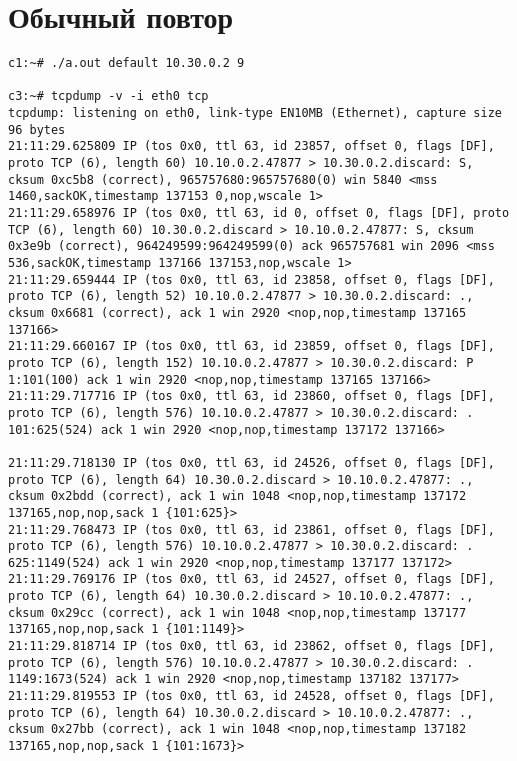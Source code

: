 \documentclass[a4paper,12pt]{article}
\begin{document}
\section{Обычный повтор}

\begin{lstlisting}
c1:~# ./a.out default 10.30.0.2 9

c3:~# tcpdump -v -i eth0 tcp
tcpdump: listening on eth0, link-type EN10MB (Ethernet), capture size 96 bytes
21:11:29.625809 IP (tos 0x0, ttl 63, id 23857, offset 0, flags [DF], proto TCP (6), length 60) 10.10.0.2.47877 > 10.30.0.2.discard: S, cksum 0xc5b8 (correct), 965757680:965757680(0) win 5840 <mss 1460,sackOK,timestamp 137153 0,nop,wscale 1>
21:11:29.658976 IP (tos 0x0, ttl 63, id 0, offset 0, flags [DF], proto TCP (6), length 60) 10.30.0.2.discard > 10.10.0.2.47877: S, cksum 0x3e9b (correct), 964249599:964249599(0) ack 965757681 win 2096 <mss 536,sackOK,timestamp 137166 137153,nop,wscale 1>
21:11:29.659444 IP (tos 0x0, ttl 63, id 23858, offset 0, flags [DF], proto TCP (6), length 52) 10.10.0.2.47877 > 10.30.0.2.discard: ., cksum 0x6681 (correct), ack 1 win 2920 <nop,nop,timestamp 137165 137166>
21:11:29.660167 IP (tos 0x0, ttl 63, id 23859, offset 0, flags [DF], proto TCP (6), length 152) 10.10.0.2.47877 > 10.30.0.2.discard: P 1:101(100) ack 1 win 2920 <nop,nop,timestamp 137165 137166>
21:11:29.717716 IP (tos 0x0, ttl 63, id 23860, offset 0, flags [DF], proto TCP (6), length 576) 10.10.0.2.47877 > 10.30.0.2.discard: . 101:625(524) ack 1 win 2920 <nop,nop,timestamp 137172 137166>

21:11:29.718130 IP (tos 0x0, ttl 63, id 24526, offset 0, flags [DF], proto TCP (6), length 64) 10.30.0.2.discard > 10.10.0.2.47877: ., cksum 0x2bdd (correct), ack 1 win 1048 <nop,nop,timestamp 137172 137165,nop,nop,sack 1 {101:625}>
21:11:29.768473 IP (tos 0x0, ttl 63, id 23861, offset 0, flags [DF], proto TCP (6), length 576) 10.10.0.2.47877 > 10.30.0.2.discard: . 625:1149(524) ack 1 win 2920 <nop,nop,timestamp 137177 137172>
21:11:29.769176 IP (tos 0x0, ttl 63, id 24527, offset 0, flags [DF], proto TCP (6), length 64) 10.30.0.2.discard > 10.10.0.2.47877: ., cksum 0x29cc (correct), ack 1 win 1048 <nop,nop,timestamp 137177 137165,nop,nop,sack 1 {101:1149}>
21:11:29.818714 IP (tos 0x0, ttl 63, id 23862, offset 0, flags [DF], proto TCP (6), length 576) 10.10.0.2.47877 > 10.30.0.2.discard: . 1149:1673(524) ack 1 win 2920 <nop,nop,timestamp 137182 137177>
21:11:29.819553 IP (tos 0x0, ttl 63, id 24528, offset 0, flags [DF], proto TCP (6), length 64) 10.30.0.2.discard > 10.10.0.2.47877: ., cksum 0x27bb (correct), ack 1 win 1048 <nop,nop,timestamp 137182 137165,nop,nop,sack 1 {101:1673}>


\end{lstlisting}
\end{document}
